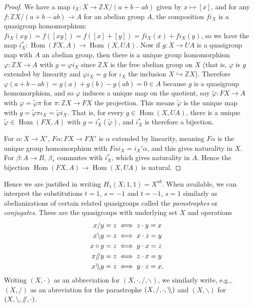 \documentclass[11pt]{amsart}
\theoremstyle{definition}
\newcommand{\Z}{\mathbb{Z}}
\newcommand{\dslash}{/\mkern-5mu/}
\newcommand{\dbslash}{\backslash\mkern-5mu\backslash}
\DeclareMathOperator{\Hom}{Hom}
\begin{document}
\begin{proof}
    We have a map $i_X : X \to \Z X / (a + b - ab)$ given by $x \mapsto [x]$, and for any $f: \Z X / (a + b - ab) \to A$ for an abelian group $A$, the composition $fi_X$ is a quasigroup homomorphism: $fi_X(xy) = f([xy]) = f([x] + [y]) = fi_X(x) + fi_X(y)$, so we have the map $i_X^*: \Hom(FX,A) \to \Hom(X,UA)$. Now if $g: X \to UA$ is a quasigroup map with $A$ an abelian group, then there is a unique group homomorphism $\varphi: \Z X \to A$ with $g = \varphi i_X$ since $\Z X$ is the free abelian group on $X$ (that is, $\varphi$ is $g$ extended by linearity and $\varphi \iota_X = g$ for $\iota_X$ the inclusion $X \hookrightarrow \Z X$). Therefore $\varphi(a + b - ab) = g(a) + g(b) - g(ab) = 0 \in A$ because $g$ is a quasigroup homomorphism, and so $\varphi$ induces a unique map on the quotient, say $\tilde{\varphi}: FX \to A$ with $\varphi = \tilde{\varphi} \pi$ for $\pi: \Z X \to FX$ the projection. This means $\tilde{\varphi}$ is the unique map with $g = \tilde{\varphi} \pi \iota_X = \tilde{\varphi} i_X$. That is, for every $g \in \Hom(X, UA)$, there is a unique $\tilde{\varphi} \in \Hom(FX, A)$ with $g = i_X^*(\tilde{\varphi})$, and $i_X^*$ is therefore a bijection. 

    For $\alpha: X \to X'$, $F\alpha: FX \to FX'$ is $\alpha$ extended by linearity, meaning $F\alpha$ is the unique group homomorphism with $F\alpha i_X = i_X' \alpha$, and this gives naturality in $X$. For $\beta: A \to B$, $\beta_*$ commutes with $i_X^*$, which gives naturality in $A$. Hence the bijection $\Hom(FX,A) \to \Hom(X, UA)$ is natural. 
\end{proof}

Hence we are justified in writing $H_1(X;1,1) = X^{ab}$. When available, we can interpret the substitutions $t = 1$, $s = -1$ and $t = -1$, $s = 1$ similarly as abelianizations of certain related quasigroups called the {\it parastrophes} or {\it conjugates}. These are the quasigroups with underlying set $X$ and operations \begin{align*}
    x / y &= z \iff z \cdot y = x \\
    x \backslash y &= z \iff x \cdot z = y \\
    x \circ y &= z \iff y \cdot x = z \\
    x \dslash y &= z \iff z \cdot x = y \\
    x \dbslash y &= z \iff y \cdot z = x.
\end{align*} Writing $(X,\cdot)$ as an abbreviation for $(X, \cdot, /, \backslash)$, we similarly write, e.g., $(X, /)$ as an abreviation for the parastrophe $(X, /, \cdot, \dbslash)$ and $(X, \backslash)$ for $(X, \backslash, \dslash, \cdot)$. 
\end{document}

